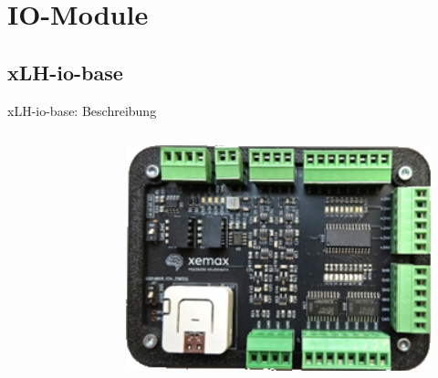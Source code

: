 \documentclass[10pt]{beamer}
\begin{document}
    \section{IO-Module}
        \subsection{xLH-io-base}
            \begin{frame}{xLH-io-base: Beschreibung}
                \begin{columns}
                    \begin{column}{0.75\textwidth}
                        
                    \end{column}
                    \begin{column}{0.25\textwidth}
                        \begin{figure}[h]
                            \centering
                            \includegraphics[width=1.0\textwidth]{graphics/xLH-io-base}
                        \end{figure}
                    \end{column}
                \end{columns}
            \end{frame}
\end{document}
